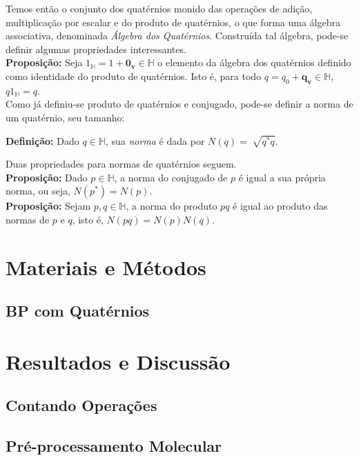 \documentclass[a4paper,12pt]{report}
\theoremstyle{plain}
\theoremstyle{definition}
\begin{document}
	Temos então o conjunto dos quatérnios monido das operações de adição, multiplicação por escalar e do produto de quatérnios, o que forma uma álgebra associativa, denominada \textit{Álgebra dos Quatérnios}. Construída tal álgebra, pode-se definir algumas propriedades interessantes.
	\\
	
	\textbf{Proposição:} Seja $1_\mathbb{H} = 1 + \mathbf{0_v} \in \mathbb{H}$ o elemento da álgebra dos quatérnios definido como identidade do produto de quatérnios. Isto é, para todo $q = q_0 + \mathbf{q_v} \in \mathbb{H}$, $q1_\mathbb{H} = q$.
	\\
	
	Como já definiu-se produto de quatérnios e conjugado, pode-se definir a norma de um quatérnio, seu tamanho:
	
	\textbf{Definição:} Dado $q \in \mathbb{H}$, sua \textit{norma} é dada por $N(q) = \sqrt[]{q^*q}$. 
	
	Duas propriedades para normas de quatérnios seguem. 
	\\
	
	\textbf{Proposição:} Dado $p \in \mathbb{H}$, a norma do conjugado de $p$ é igual a sua própria norma, ou seja, $N(p^*) = N(p)$.
	\\
	
	\textbf{Proposição:} Sejam $p, q \in \mathbb{H}$, a norma do produto $pq$ é igual ao produto das normas de $p$ e $q$, isto é, $N(pq) = N(p)N(q)$.
	\\
	
	
	
	\newpage
	\chapter{Materiais e Métodos}
	\section{BP com Quatérnios}
	
	\chapter{Resultados e Discussão}
	\section{Contando Operações}
	\section{Pré-processamento Molecular}
\end{document}
